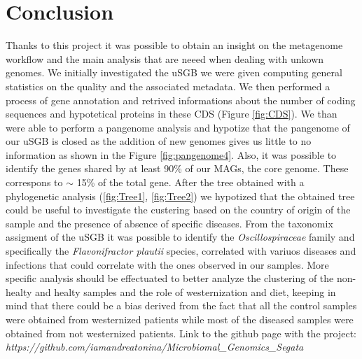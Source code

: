 \documentclass[a4paper,titlepage, oneside]{book}
\begin{document}
\chapter{Conclusion}
Thanks to this project it was possible to obtain an insight on the metagenome workflow and the main analysis that are neeed when dealing with unkown genomes.
We initially investigated the uSGB we were given computing general statistics on the quality and the associated metadata.
We then performed a process of gene annotation and retrived informations about the number of coding sequences and hypotetical proteins in these CDS (Figure \ref{fig:CDS}).
We than were able to perform a pangenome analysis and hypotize that the pangenome of our uSGB is closed as the addition of new genomes gives us little to no information as shown in the Figure \ref{fig:pangenome4}. Also, it was possible to identify the genes shared by at least 90\% of our MAGs, the core genome. These correspons to $\sim$ 15\% of the total gene.
After the tree obtained with a phylogenetic analysis (\ref{fig:Tree1}, \ref{fig:Tree2}) we hypotized that the obtained tree could be useful to investigate the custering based on the country of origin of the sample and the presence of absence of specific diseases.
From the taxonomix assigment of the uSGB it was possible to identify the \textit{Oscillospiraceae} family and specifically the \textit{Flavonifractor plautii} species, correlated with variuos diseases and infections \cite{HipJoint,PlautiiDiseases, PlautiiBlood} that could correlate with the ones observed in our samples. More specific analysis should be effectuated to better analyze the clustering of the non-healty and healty samples and the role of westernization and diet, keeping in mind that there could be a bias derived from the fact that all the control samples were obtained from westernized patients while most of the diseased samples were obtained from not westernized patients.
\vfill
Link to the github page with the project: \textit{https://github.com/iamandreatonina/Microbiomal\_Genomics\_Segata}
\end{document}
